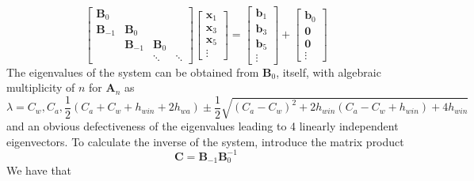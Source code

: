 \documentclass[11pt]{article}
\begin{document}
\begin{equation}
\left[ \begin{array}{cccc}\mathbf{B}_{0} & & & \\ \mathbf{B}_{-1} & \mathbf{B}_{0}  & & \\ & \mathbf{B}_{-1} & \mathbf{B}_{0} & \\ & & \ddots & \ddots \end{array}\right]\left[ \begin{array}{c} \mathbf{x}_{1} \\ \mathbf{x}_{3} \\ \mathbf{x}_{5} \\ \vdots   \end{array}\right] = \left[ \begin{array}{c} \mathbf{b}_1  \\ \mathbf{b}_3 \\ \mathbf{b}_5 \\ \vdots \end{array}\right] + \left[ \begin{array}{c} \mathbf{b}_0 \\ \mathbf{0} \\ \mathbf{0} \\ \vdots \end{array}\right]
\end{equation}
The eigenvalues of the system can be obtained from $\mathbf{B}_0$, itself, with algebraic multiplicity of $n$ for $\mathbf{A}_n$ as
\begin{equation}
\lambda = C_w, C_a, \frac{1}{2}(C_a+C_w +h_{win}+2h_{wa}) \pm \frac{1}{2}\sqrt{(C_a-C_w)^2+2h_{win}(C_a-C_w+h_{win})+4h_{win}}
\end{equation}
and an obvious defectiveness of the eigenvalues leading to 4 linearly independent eigenvectors. To calculate the inverse of the system, introduce the matrix product 
\begin{equation}
\mathbf{C} = \mathbf{B}_{-1} \mathbf{B}_{0}^{-1} 
\end{equation}
We have that
\end{document}
